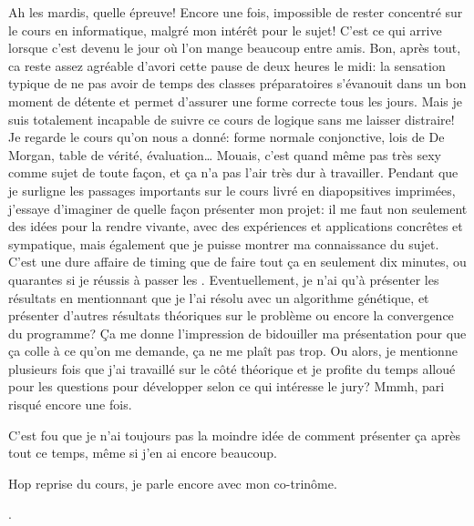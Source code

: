 \documentclass[letterpaper, 12pt]{report} %
\begin{document}
{Ah les mardis, quelle épreuve! 
Encore une fois, impossible de rester concentré sur le cours en informatique, malgré mon intérêt pour le sujet!
C'est ce qui arrive lorsque c'est devenu le jour où l'on mange beaucoup entre amis.
Bon, après tout, ca reste assez agréable d'avori cette pause de deux heures le midi: la sensation typique de ne pas avoir de temps des classes préparatoires s'évanouit dans un bon moment de détente et permet d'assurer une forme correcte tous les jours.
Mais je suis totalement incapable de suivre ce cours de logique sans me laisser distraire!
Je regarde le cours qu'on nous a donné: forme normale conjonctive, lois de De Morgan, table de vérité, évaluation\dots
Mouais, c'est quand même pas très sexy comme sujet de toute façon, et ça n'a pas l'air très dur à travailler.
Pendant que je surligne les passages importants sur le cours livré en diapopsitives imprimées, j'essaye d'imaginer de quelle façon présenter mon projet:
il me faut non seulement des idées pour la rendre vivante, avec des expériences et applications concrêtes et sympatique, mais également que je puisse montrer ma connaissance du sujet.
C'est une dure affaire de timing que de faire tout ça en seulement dix minutes, ou quarantes si je réussis à passer les .
Eventuellement, je n'ai qu'à présenter les résultats en mentionnant que je l'ai résolu avec un algorithme génétique, et présenter d'autres résultats théoriques sur le problème ou encore la convergence du programme?
Ça me donne l'impression de bidouiller ma présentation pour que ça colle à ce qu'on me demande, ça ne me plaît pas trop.
Ou alors, je mentionne plusieurs fois que j'ai travaillé sur le côté théorique et je profite du temps alloué pour les questions pour développer selon ce qui intéresse le jury?
Mmmh, pari risqué encore une fois.

C'est fou que je n'ai toujours pas la moindre idée de comment présenter ça après tout ce temps, même si j'en ai encore beaucoup.

Hop reprise du cours, je parle encore avec mon co-trinôme.
\begin{dialogue}
    .
\end{dialogue}

}
\end{document}

